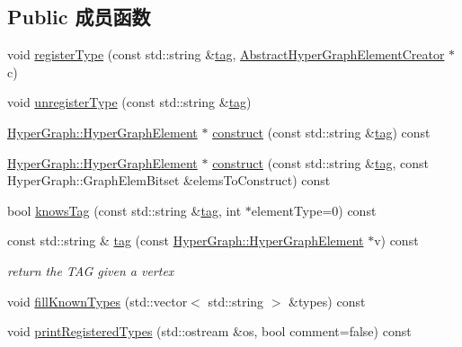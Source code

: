 \subsection*{Public 成员函数}
\begin{DoxyCompactItemize}
\item 
void \hyperlink{classg2o_1_1Factory_aba2f2e40635fd1b996981cefdb65c346}{register\-Type} (const std\-::string \&\hyperlink{classg2o_1_1Factory_a337d1377ea4e47c31dd04e85e51a2516}{tag}, \hyperlink{classg2o_1_1AbstractHyperGraphElementCreator}{Abstract\-Hyper\-Graph\-Element\-Creator} $\ast$c)
\item 
void \hyperlink{classg2o_1_1Factory_a01b16c7d5a49ddab5ccd5980f76900b7}{unregister\-Type} (const std\-::string \&\hyperlink{classg2o_1_1Factory_a337d1377ea4e47c31dd04e85e51a2516}{tag})
\item 
\hyperlink{structg2o_1_1HyperGraph_1_1HyperGraphElement}{Hyper\-Graph\-::\-Hyper\-Graph\-Element} $\ast$ \hyperlink{classg2o_1_1Factory_afd0e0c7021e344087a09ade1c11bc15c}{construct} (const std\-::string \&\hyperlink{classg2o_1_1Factory_a337d1377ea4e47c31dd04e85e51a2516}{tag}) const 
\item 
\hyperlink{structg2o_1_1HyperGraph_1_1HyperGraphElement}{Hyper\-Graph\-::\-Hyper\-Graph\-Element} $\ast$ \hyperlink{classg2o_1_1Factory_adb39d806299cacf7e1d4f982bc22a45f}{construct} (const std\-::string \&\hyperlink{classg2o_1_1Factory_a337d1377ea4e47c31dd04e85e51a2516}{tag}, const Hyper\-Graph\-::\-Graph\-Elem\-Bitset \&elems\-To\-Construct) const 
\item 
bool \hyperlink{classg2o_1_1Factory_a57d370d8b31c214215cd6df31e5eb472}{knows\-Tag} (const std\-::string \&\hyperlink{classg2o_1_1Factory_a337d1377ea4e47c31dd04e85e51a2516}{tag}, int $\ast$element\-Type=0) const 
\item 
\hypertarget{classg2o_1_1Factory_a337d1377ea4e47c31dd04e85e51a2516}{const std\-::string \& \hyperlink{classg2o_1_1Factory_a337d1377ea4e47c31dd04e85e51a2516}{tag} (const \hyperlink{structg2o_1_1HyperGraph_1_1HyperGraphElement}{Hyper\-Graph\-::\-Hyper\-Graph\-Element} $\ast$v) const }\label{classg2o_1_1Factory_a337d1377ea4e47c31dd04e85e51a2516}

\begin{DoxyCompactList}\small\item\em return the T\-A\-G given a vertex \end{DoxyCompactList}\item 
void \hyperlink{classg2o_1_1Factory_ae7c0f4e892d3c5af8cd198ceb144476f}{fill\-Known\-Types} (std\-::vector$<$ std\-::string $>$ \&types) const 
\item 
void \hyperlink{classg2o_1_1Factory_a0a9e898c4025151062856f4aa5ab6092}{print\-Registered\-Types} (std\-::ostream \&os, bool comment=false) const 
\end{DoxyCompactItemize}
